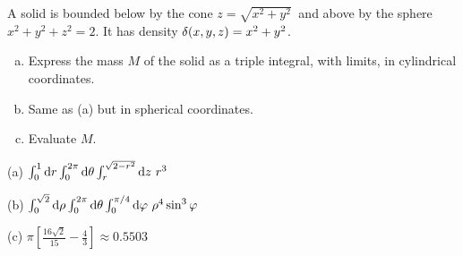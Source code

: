 \begin{question}[M200 2009A] %
A solid is bounded below by the cone $z\!=\!\sqrt{x^2\!+\!y^2}\ $ and above  
by the sphere $x^2+y^2+z^2 = 2$. 
It has density $\delta(x,y,z) = x^2 + y^2$.


\begin{enumerate}[(a)]
\item
Express the mass $M$ of the solid as a triple integral, with limits, in cylindrical coordinates.

\item
Same as (a) but in spherical coordinates.

\item
Evaluate $M$.

\end{enumerate} 
\end{question}

%

\begin{answer}
(a) $\int_0^1\mathrm{d}r\int_0^{2\pi}\mathrm{d}\theta
           \int_r^{\sqrt{2-r^2}}\mathrm{d}z\ r^3$

(b)  $\int_0^{\sqrt{2}}\mathrm{d}\rho\int_0^{2\pi}\mathrm{d}\theta
           \int_0^{\pi/4}\mathrm{d}\varphi\ \rho^4\sin^3\varphi$

(c) $\pi \left[\frac{16\sqrt{2}}{15} - \frac{4}{3}\right]
     \approx 0.5503$
\end{answer}

